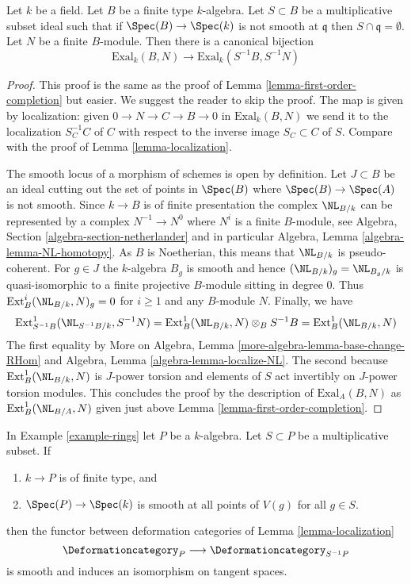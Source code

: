 \begin{lemma}
\label{lemma-first-order-localization}
Let $k$ be a field. Let $B$ be a finite type $k$-algebra.
Let $S \subset B$ be a multiplicative subset ideal such that
if $\Spec(B) \to \Spec(k)$ is not smooth at $\mathfrak q$
then $S \cap \mathfrak q = \emptyset$.
Let $N$ be a finite $B$-module.
Then there is a canonical bijection
$$
\text{Exal}_k(B, N) \to \text{Exal}_k(S^{-1}B, S^{-1}N)
$$
\end{lemma}

\begin{proof}
This proof is the same as the proof of
Lemma \ref{lemma-first-order-completion} but easier. We suggest the
reader to skip the proof.
The map is given by localization: given $0 \to N \to C \to B \to 0$
in $\text{Exal}_k(B, N)$ we send it to the localization $S_C^{-1}C$
of $C$ with respect to the inverse image $S_C \subset C$ of $S$.
Compare with the proof of Lemma \ref{lemma-localization}.

\medskip\noindent
The smooth locus of a morphism of schemes is open by definition.
Let $J \subset B$ be an ideal cutting out the set of points
in $\Spec(B)$ where $\Spec(B) \to \Spec(A)$ is not smooth.
Since $k \to B$ is of finite presentation the complex
$\NL_{B/k}$ can be represented by a complex
$N^{-1} \to N^0$ where $N^i$ is a finite $B$-module, see
Algebra, Section \ref{algebra-section-netherlander} and
in particular
Algebra, Lemma \ref{algebra-lemma-NL-homotopy}.
As $B$ is Noetherian, this means that $\NL_{B/k}$
is pseudo-coherent. For $g \in J$ the $k$-algebra $B_g$
is smooth and hence $(\NL_{B/k})_g = \NL_{B_g/k}$
is quasi-isomorphic to a finite projective $B$-module sitting in degree $0$.
Thus $\text{Ext}^i_B(\NL_{B/k}, N)_g = 0$ for $i \geq 1$
and any $B$-module $N$. Finally, we have
$$
\text{Ext}^1_{S^{-1}B}(\NL_{S^{-1}B/k}, S^{-1}N) =
\text{Ext}^1_B(\NL_{B/k}, N) \otimes_B S^{-1}B =
\text{Ext}^1_B(\NL_{B/k}, N)
$$
The first equality by
More on Algebra, Lemma \ref{more-algebra-lemma-base-change-RHom}
and Algebra, Lemma \ref{algebra-lemma-localize-NL}.
The second because $\text{Ext}^1_B(\NL_{B/k}, N)$ is $J$-power
torsion and elements of $S$ act invertibly on $J$-power torsion modules.
This concludes the proof by the description of $\text{Exal}_A(B, N)$
as $\text{Ext}^1_B(\NL_{B/A}, N)$ given just above
Lemma \ref{lemma-first-order-completion}.
\end{proof}

\begin{lemma}
\label{lemma-smooth-localization}
In Example \ref{example-rings} let $P$ be a $k$-algebra.
Let $S \subset P$ be a multiplicative subset. If
\begin{enumerate}
\item $k \to P$ is of finite type, and
\item $\Spec(P) \to \Spec(k)$ is smooth at all points of
$V(g)$ for all $g \in S$.
\end{enumerate}
then the functor between deformation categories of
Lemma \ref{lemma-localization}
$$
\Deformationcategory_P \longrightarrow \Deformationcategory_{S^{-1}P}
$$
is smooth and induces an isomorphism on tangent spaces.
\end{lemma}

